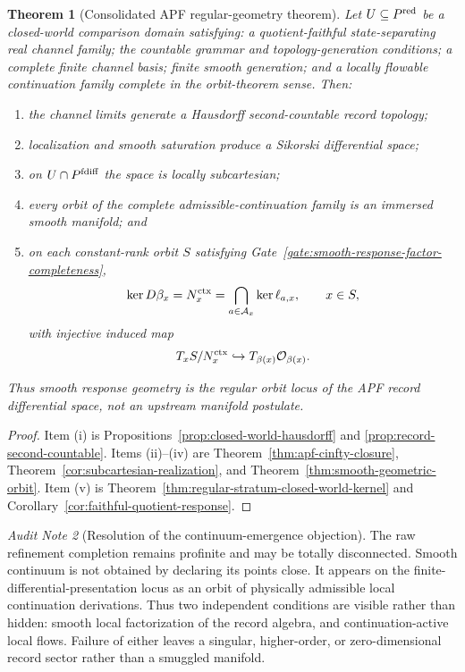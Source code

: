\documentclass[11pt]{article}
\newtheorem{theorem}{Theorem}[section]
\theoremstyle{remark}
\newtheorem{audit}[theorem]{Audit Note}
\begin{document}
\begin{theorem}[Consolidated APF regular-geometry theorem]
\label{thm:consolidated-regular-geometry}
Let $U\subseteq P^{\rm red}$ be a closed-world comparison domain satisfying:
a quotient-faithful state-separating real channel family; the countable grammar
and topology-generation conditions; a complete finite channel basis; finite
smooth generation; and a locally flowable continuation family complete in the
orbit-theorem sense.  Then:
\begin{enumerate}[label=(\roman*)]
\item the channel limits generate a Hausdorff second-countable record topology;
\item localization and smooth saturation produce a Sikorski differential space;
\item on $U\cap P^{\rm fdiff}$ the space is locally subcartesian;
\item every orbit of the complete admissible-continuation family is an immersed
smooth manifold; and
\item on each constant-rank orbit $S$ satisfying
Gate~\ref{gate:smooth-response-factor-completeness},
\[
\ker D\beta_x
=N_x^{\rm ctx}
=\bigcap_{a\in\mathcal A_x}\ker\ell_{a,x},
\qquad x\in S,
\]
with injective induced map
\[
T_xS/N_x^{\rm ctx}\hookrightarrow T_{\beta(x)}\mathcal O_{\beta(x)}.
\]
\end{enumerate}
Thus smooth response geometry is the regular orbit locus of the APF record
differential space, not an upstream manifold postulate.
\end{theorem}

\begin{proof}
Item (i) is Propositions~\ref{prop:closed-world-hausdorff} and
\ref{prop:record-second-countable}.  Items (ii)--(iv) are
Theorem~\ref{thm:apf-cinfty-closure},
Theorem~\ref{cor:subcartesian-realization}, and
Theorem~\ref{thm:smooth-geometric-orbit}.  Item (v) is
Theorem~\ref{thm:regular-stratum-closed-world-kernel} and
Corollary~\ref{cor:faithful-quotient-response}.
\end{proof}

\begin{audit}[Resolution of the continuum-emergence objection]
The raw refinement completion remains profinite and may be totally
disconnected.  Smooth continuum is not obtained by declaring its points
close.  It appears on the finite-differential-presentation locus as an orbit of
physically admissible local continuation derivations.  Thus two independent
conditions are visible rather than hidden: smooth local factorization of the
record algebra, and continuation-active local flows.  Failure of either leaves
a singular, higher-order, or zero-dimensional record sector rather than a
smuggled manifold.
\end{audit}
\end{document}

